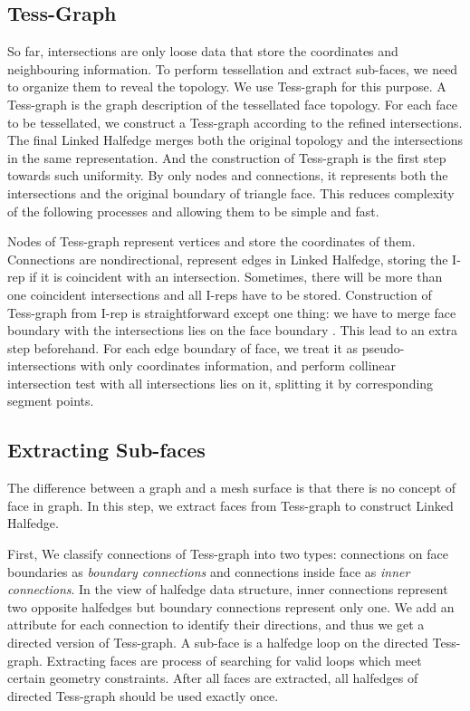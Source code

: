 \documentclass[10pt,journal,compsoc]{IEEEtran}
\begin{document}
\subsection{Tess-Graph}

So far, intersections are only loose data that store the coordinates and neighbouring information. To perform tessellation and extract sub-faces, we need to organize them to reveal the topology. We use Tess-graph for this purpose. A Tess-graph is the graph description of the tessellated face topology. For each face to be tessellated, we construct a Tess-graph according to the refined intersections. The final Linked Halfedge merges both the original topology and the intersections in the same representation. And the construction of Tess-graph is the first step towards such uniformity. By only nodes and connections, it represents both the intersections and the original boundary of triangle face. This reduces complexity of the following processes and allowing them to be simple and fast.


Nodes of Tess-graph represent vertices and store the coordinates of them. Connections are nondirectional, represent edges in Linked Halfedge, storing the I-rep if it is coincident with an intersection. Sometimes, there will be more than one coincident intersections and all I-reps have to be stored. Construction of Tess-graph from I-rep is straightforward except one thing: we have to merge face boundary with the intersections lies on the face boundary {\color{red}{Fig}}. This lead to an extra step beforehand. For each edge boundary of face, we treat it as pseudo-intersections with only coordinates information, and perform collinear intersection test with all intersections lies on it, splitting it by corresponding segment points.

\subsection{Extracting Sub-faces}

The difference between a graph and a mesh surface is that there is no concept of face in graph. In this step, we extract faces from Tess-graph to construct Linked Halfedge.

First, We classify connections of Tess-graph into two types: connections on face boundaries as \emph{boundary connections} and connections inside face as \emph{inner connections}. In the view of halfedge data structure, inner connections represent two opposite halfedges but boundary connections represent only one. We add an attribute for each connection to identify their directions, and thus we get a directed version of Tess-graph. A sub-face is a halfedge loop on the directed Tess-graph. Extracting faces are process of searching for valid loops which meet certain geometry constraints. After all faces are extracted, all halfedges of directed Tess-graph should be used exactly once.
\end{document}

